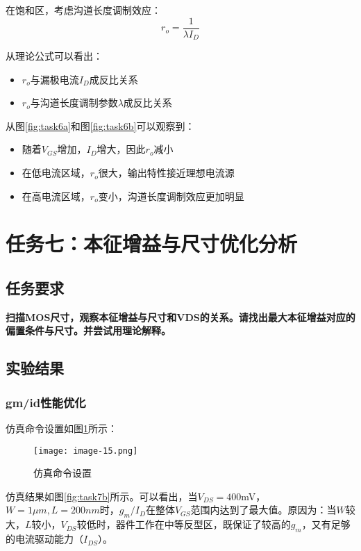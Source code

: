 \documentclass[UTF8,12pt,a4paper]{ctexart}
\begin{document}
在饱和区，考虑沟道长度调制效应：
\begin{equation}
r_o = \frac{1}{\lambda I_D}
\end{equation}

从理论公式可以看出：
\begin{itemize}
\item $r_o$与漏极电流$I_D$成反比关系
\item $r_o$与沟道长度调制参数$\lambda$成反比关系
\end{itemize}

从图\ref{fig:task6a}和图\ref{fig:task6b}可以观察到：
\begin{itemize}
\item 随着$V_{GS}$增加，$I_D$增大，因此$r_o$减小
\item 在低电流区域，$r_o$很大，输出特性接近理想电流源
\item 在高电流区域，$r_o$变小，沟道长度调制效应更加明显
\end{itemize}

\newpage
\section{任务七：本征增益与尺寸优化分析}
\subsection{任务要求}
\textbf{扫描MOS尺寸，观察本征增益与尺寸和VDS的关系。请找出最大本征增益对应的偏置条件与尺寸。并尝试用理论解释。}

\subsection{实验结果}

\subsubsection{gm/id性能优化}

仿真命令设置如图\ref{fig:task7a}所示：
\begin{figure}[h]
\centering
\texttt{[image: image-15.png]}
\caption{仿真命令设置}
\label{fig:task7a}
\end{figure}

仿真结果如图\ref{fig:task7b}所示。可以看出，当$V_{DS}=400$mV，$W=1\mu m, L=200nm$时，$g_m/I_D$在整体$V_{GS}$范围内达到了最大值。原因为：当$W$较大，$L$较小，$V_{DS}$较低时，器件工作在中等反型区，既保证了较高的$g_m$，又有足够的电流驱动能力（$I_{DS}$）。
\end{document}
